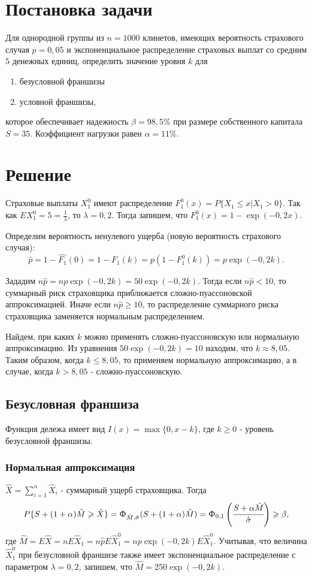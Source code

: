 \documentclass[a4paper,12pt]{article}
\begin{document}

\tableofcontents
\pagebreak

\section{Постановка задачи}
Для однородной группы из $n = 1000$ клинетов, имеющих вероятность страхового случая $p = 0,05$ и экспоненциальное распределение страховых выплат со средним $5$ денежных единиц, определить значение уровня $k$ для 
\begin{enumerate}
	\item безусловной франшизы
	\item условной франшизы,
\end{enumerate}
которое обеспечивает надежность $\beta = 98,5\%$ при размере собственного капитала $S = 35$. Коэффициент нагрузки равен $\alpha = 11\%$.

\section{Решение}
Страховые выплаты $X_1^0$ имеют распределение $F_1^0(x) = P\{X_1 \le x | X_1 > 0\}$. Так как $EX_1^0 = 5 = \frac{1}{\lambda}$, то $\lambda = 0,2$. Тогда запишем, что $F_1^0(x) = 1 - \exp(-0,2 x)$.

Определим вероятность ненулевого ущерба (новую вероятность страхового случая):
\[\hat{p} = 1 - \hat{F_1}(0) = 1 - F_1(k) = p (1 - F_1^0(k)) = p \exp(-0,2 k).\]

Зададим $n\hat{p} = np\exp(-0,2k) = 50 \exp (-0,2 k)$. Тогда если $n\hat{p} < 10$, то суммарный риск страховщика приближается сложно-пуассоновской аппроксимацией. Иначе если $n\hat{p} \ge 10$, то распределение суммарного риска страховщика заменяется нормальным распределением.

Найдем, при каких $k$ можно применять сложно-пуассоновскую или нормальную аппроксимацию. Из уравнения $50 \exp (-0,2 k) = 10$ находим, что $k \approx 8,05$. Таким образом, когда $k \le 8,05$, то применяем нормальную аппроксимацию, а в случае, когда $k > 8,05$ - сложно-пуассоновскую.

\subsection{Безусловная франшиза}
Функция дележа имеет вид $I(x) = \max\{0, x - k\}$, где $k \ge 0$ - уровень безусловной франшизы. 

\subsubsection{Нормальная аппроксимация}
$\hat{X} = \sum_{i=1}^{n} \hat{X}_i$ - суммарный ущерб страховщика. Тогда \[P\{S + (1 + \alpha)\hat{M} \ge \hat{X}\} = \Upphi_{\hat{M}, \hat{\sigma}}(S + (1 + \alpha)\hat{M}) = \Upphi_{0, 1}\left(\cfrac{S + \alpha\hat{M}}{\hat{\sigma}}\right) \ge \beta,\]
где $\hat{M} = E\hat{X} = nE\hat{X}_1 = n\hat{p}E\hat{X}_1^0 = np\exp(-0,2k)E\hat{X}_1^0$. Учитывая, что величина $\hat{X}_1^0$ при безусловной франшизе также имеет экспоненциальное распределение с параметром $\lambda = 0,2$, запишем, что $\hat{M} = 250\exp(-0,2k)$.
 
\end{document}
